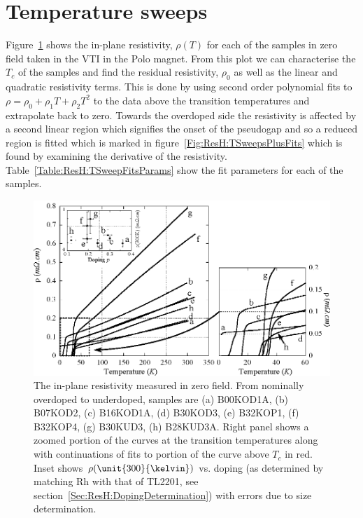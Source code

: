 \section{Temperature sweeps}

Figure~\ref{Fig:ResH:TSweeps} shows the in-plane resistivity, $\rho(T)$ for each of the samples in zero field taken in the \ac{VTI} in the Polo magnet. From this plot we can characterise the $T_c$ of the samples and find the residual resistivity, $\rho_0$ as well as the linear and quadratic resistivity terms. This is done by using second order polynomial fits to $\rho = \rho_0 + \rho_1 T + \rho_2 T^2$ to the data above the transition temperatures and extrapolate back to zero. Towards the overdoped side the resistivity is affected by a second linear region which signifies the onset of the pseudogap and so a reduced region is fitted which is marked in figure~\ref{Fig:ResH:TSweepsPlusFits} which is found by examining the derivative of the resistivity.  Table~\ref{Table:ResH:TSweepFitsParams} show the fit parameters for each of the samples. 
\begin{figure}[htbp]
	\begin{center}
		\includegraphics[scale=1.0]{Chapter-HallBSCO/Figures/TSweeps/TSweeps}
		\caption{The in-plane resistivity measured in zero field. From nominally overdoped to underdoped, samples are (a) B00KOD1A, (b) B07KOD2, (c) B16KOD1A, (d) B30KOD3, (e) B32KOP1, (f) B32KOP4, (g) B30KUD3, (h) B28KUD3A. Right panel shows a zoomed portion of the curves at the transition temperatures along with continuations of fits to portion of the curve above $T_c$ in red. Inset shows $\rho(\unit{300}{\kelvin})$ vs. doping (as determined by matching Rh with that of \ac{TL2201}, see section~\ref{Sec:ResH:DopingDetermination}) with errors due to size determination.}
		\label{Fig:ResH:TSweeps}
	\end{center}
\end{figure}
